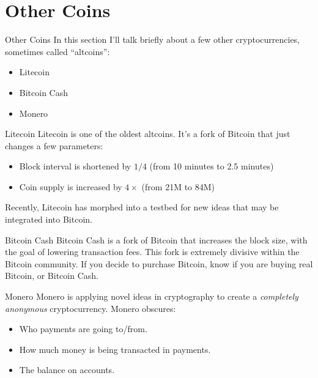 \documentclass[14pt]{beamer}
\begin{document}
\section{Other Coins}

\begin{frame}{Other Coins}
  In this section I'll talk briefly about a few other cryptocurrencies,
  sometimes called ``altcoins'':

  \begin{itemize}
  \item Litecoin
  \item Bitcoin Cash
  \item Monero
  \end{itemize}
\end{frame}

\begin{frame}{Litecoin}
  Litecoin is one of the oldest altcoins. It's a fork of Bitcoin that just changes a few parameters:
  \newline
  \begin{itemize}
  \item Block interval is shortened by $1 / 4$ (from 10 minutes to 2.5 minutes)
  \item Coin supply is increased by $4 \times$ (from 21M to 84M)
  \end{itemize}
  Recently, Litecoin has morphed into a testbed for new ideas that may be
  integrated into Bitcoin.
\end{frame}

\begin{frame}{Bitcoin Cash}
  Bitcoin Cash is a fork of Bitcoin that increases the block size, with the goal
  of lowering transaction fees.
  \newline
  \newline
  This fork is extremely divisive within the Bitcoin community.
  \newline
  \newline
  If you decide to purchase Bitcoin, know if you are buying real Bitcoin, or
  Bitcoin Cash.
\end{frame}

\begin{frame}{Monero}
  Monero is applying novel ideas in cryptography to create a \emph{completely
    anonymous} cryptocurrency.
  \newline
  \newline
  Monero obscures:
  \begin{itemize}
  \item Who payments are going to/from.
  \item How much money is being transacted in payments.
  \item The balance on accounts.
  \end{itemize}
\end{frame}
\end{document}
